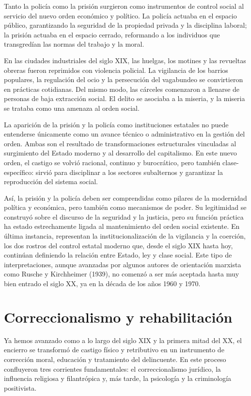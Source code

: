 \documentclass[
  spanish,
  letterpaper,
  DIV=11,
  numbers=noendperiod]{scrreprt}
\begin{document}
Tanto la policía como la prisión surgieron como instrumentos de control
social al servicio del nuevo orden económico y político. La policía
actuaba en el espacio público, garantizando la seguridad de la propiedad
privada y la disciplina laboral; la prisión actuaba en el espacio
cerrado, reformando a los individuos que transgredían las normas del
trabajo y la moral.

En las ciudades industriales del siglo XIX, las huelgas, los motines y
las revueltas obreras fueron reprimidos con violencia policial. La
vigilancia de los barrios populares, la regulación del ocio y la
persecución del vagabundeo se convirtieron en prácticas cotidianas. Del
mismo modo, las cárceles comenzaron a llenarse de personas de baja
extracción social. El delito se asociaba a la miseria, y la miseria se
trataba como una amenaza al orden social.

La aparición de la prisión y la policía como instituciones estatales no
puede entenderse únicamente como un avance técnico o administrativo en
la gestión del orden. Ambas son el resultado de transformaciones
estructurales vinculadas al surgimiento del Estado moderno y al
desarrollo del capitalismo. En este nuevo orden, el castigo se volvió
racional, continuo y burocrático, pero también clase-específico: sirvió
para disciplinar a los sectores subalternos y garantizar la reproducción
del sistema social.

Así, la prisión y la policía deben ser comprendidas como pilares de la
modernidad política y económica, pero también como mecanismos de poder.
Su legitimidad se construyó sobre el discurso de la seguridad y la
justicia, pero su función práctica ha estado estrechamente ligada al
mantenimiento del orden social existente. En última instancia,
representan la institucionalización de la vigilancia y la coerción, los
dos rostros del control estatal moderno que, desde el siglo XIX hasta
hoy, continúan definiendo la relación entre Estado, ley y clase social.
Este tipo de interpretaciones, aunque avanzadas por algunos autores de
orientación marxista como Rusche y Kirchheimer (1939), no comenzó a ser
más aceptada hasta muy bien entrado el siglo XX, ya en la década de los
años 1960 y 1970.

\section{Correccionalismo y
rehabilitación}\label{correccionalismo-y-rehabilitaciuxf3n}

Ya hemos avanzado como a lo largo del siglo XIX y la primera mitad del
XX, el encierro se transformó de castigo físico y retributivo en un
instrumento de corrección moral, educación y tratamiento del
delincuente. En este proceso confluyeron tres corrientes fundamentales:
el correccionalismo jurídico, la influencia religiosa y filantrópica y,
más tarde, la psicología y la criminología positivista.
\end{document}
